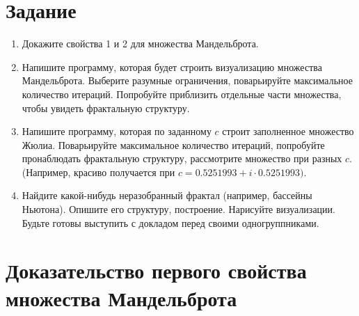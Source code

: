 \documentclass[a4paper,12pt]{article}
\begin{document}
\clearpage

\hypertarget{sec:1}{}
\section{\textbf{Задание}}
\begin{enumerate}
    \item Докажите свойства 1 и 2 для множества Мандельброта.
    \item Напишите программу, которая будет строить визуализацию множества Мандельброта. Выберите разумные ограничения, поварьируйте максимальное количество итераций. Попробуйте приблизить отдельные части множества, чтобы увидеть фрактальную структуру.
    \item Напишите программу, которая по заданному $c$ строит заполненное множество Жюлиа. Поварьируйте максимальное количество итераций, попробуйте пронаблюдать фрактальную структуру, рассмотрите множество при разных $c$. (Например, красиво получается при $c=0.5251993+i\cdot0.5251993)$.
    \item Найдите какой-нибудь неразобранный фрактал (например, бассейны Ньютона). Опишите его структуру, построение. Нарисуйте визуализации. Будьте готовы выступить с докладом перед своими одногруппниками.
\end{enumerate}

\clearpage

\hypertarget{sec:2}{}
\section{\textbf{Доказательство первого свойства множества Мандельброта}}
\end{document}

